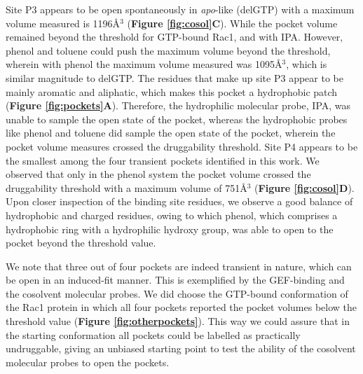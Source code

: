 \documentclass[12pt,a4paper]{achemso}
\begin{document}
Site P3 appears to be open spontaneously in \textit{apo}-like (delGTP) with a maximum volume measured is 1196\r{A}$^3$ (\textbf{Figure \ref{fig:cosol}C}). While the pocket volume remained beyond the threshold for GTP-bound Rac1, and with IPA. However, phenol and toluene could push the maximum volume beyond the threshold, wherein with phenol the maximum volume measured was 1095\r{A}$^3$, which is similar magnitude to delGTP. The residues that make up site P3 appear to be mainly aromatic and aliphatic, which makes this pocket a hydrophobic patch (\textbf{Figure \ref{fig:pockets}A}). Therefore, the hydrophilic molecular probe, IPA, was unable to sample the open state of the pocket, whereas the hydrophobic probes like phenol and toluene did sample the open state of the pocket, wherein the pocket volume measures crossed the druggability threshold. Site P4 appears to be the smallest among the four transient pockets identified in this work. We observed that only in the phenol system the pocket volume crossed the druggability threshold with a maximum volume of 751\r{A}$^3$ (\textbf{Figure \ref{fig:cosol}D}). Upon closer inspection of the binding site residues, we observe a good balance of hydrophobic and charged residues, owing to which phenol, which comprises a hydrophobic ring with a hydrophilic hydroxy group, was able to open to the pocket beyond the threshold value. 

We note that three out of four pockets are indeed transient in nature, which can be open in an induced-fit manner. This is exemplified by the GEF-binding and the cosolvent molecular probes. We did choose the GTP-bound conformation of the Rac1 protein in which all four pockets reported the pocket volumes below the threshold value (\textbf{Figure \ref{fig:otherpockets}}). This way we could assure that in the starting conformation all pockets could be labelled as practically undruggable, giving an unbiased starting point to test the ability of the cosolvent molecular probes to open the pockets. 
\end{document}
